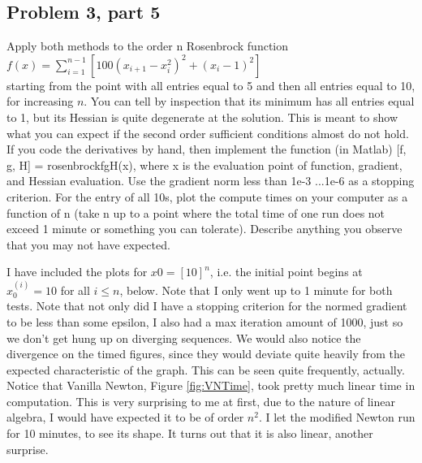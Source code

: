\subsection{Problem 3, part 5}
Apply both methods to the order n Rosenbrock function\\
$f(x) = \sum_{i = 1}^{n - 1} \left [ 100 ( x_{i+1} - x_i^2)^2 + (x_i - 1)^2\right]$\\
starting from the point with all entries equal to 5 and then all entries equal to 10, for increasing $n$. You can tell by inspection that its minimum has all entries equal to 1, but its Hessian is quite degenerate at the solution. This is meant to show what you can expect if the second order sufficient conditions almost do not hold. \\
If you code the derivatives by hand, then implement the function (in Matlab) [f, g, H] = rosenbrockfgH(x), where x is  the evaluation point of function, gradient, and Hessian evaluation. Use the gradient norm less than 1e-3 ...1e-6 as a stopping criterion. For the entry of all 10s, plot the compute times on your computer as a function of n (take n up to a point where the total time of one run does not exceed 1 minute or something you can tolerate). Describe anything you observe that you may not have expected. 
\partbreak
\begin{solution}

    I have included the plots for $x0 = [10]^n$, i.e. the initial point begins at $x_0^{(i)} = 10$ for all $i \leq n$, below. Note that I only went up to 1 minute for both tests. Note that not only did I have a stopping criterion for the normed gradient to be less than some epsilon, I also had a max iteration amount of 1000, just so we don't get hung up on diverging sequences. We would also notice the divergence on the timed figures, since they would deviate quite heavily from the expected characteristic of the graph. This can be seen quite frequently, actually. Notice that Vanilla Newton, Figure \ref{fig:VNTime}, took pretty much linear time in computation. This is very surprising to me at first, due to the nature of linear algebra, I would have expected it to be of order $n^2$. I let the modified Newton run for 10 minutes, to see its shape. It turns out that it is also linear, another surprise.  
\end{solution}


